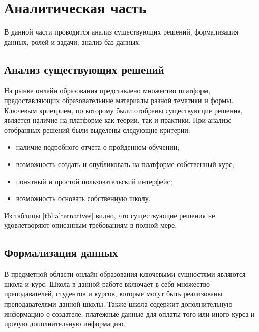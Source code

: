 \chapter{Аналитическая часть}

В данной части проводится анализ существующих решений, формализация данных, ролей и задачи, анализ баз данных.

\section{Анализ существующих решений}
На рынке онлайн образования представлено множество платформ, предоставляющих образовательные материалы разной тематики и формы. Ключевым криетрием, по которому были отобраны существующие решения, является наличие на платформе как теории, так и практики. При анализе отобранных решений были выделены следующие критерии:
\begin{itemize}
    \item наличие подробного отчета о пройденном обучении;
    \item возможность создать и опубликовать на платформе собственный курс;
    \item понятный и простой пользовательский интерфейс;
    \item возможность основать собственную школу.
\end{itemize}

\begin{table}[H]
    \caption{\label{tbl:alternatives}Сравнение существующих решений}
\end{table}

Из таблицы \ref{tbl:alternatives} видно, что существующие решения не удовлетворяют описанным требованиям в полной мере.

\section{Формализация данных}
В предметной области онлайн образования ключевыми сущностями являются школа и курс. Школа в данной работе включает в себя множество преподавателей, студентов и курсов, которые могут быть реализованы
преподавателями данной школы. Также школа содержит дополнительную информацию о создателе, платежные данные
для оплаты того или иного курса и прочую дополнительную информацию.

